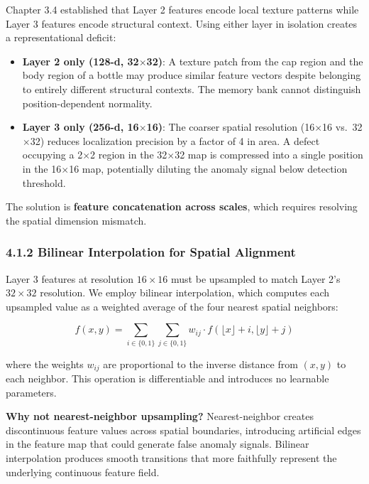 \documentclass[12pt, a4paper, oneside]{report}
\begin{document}
Chapter 3.4 established that Layer 2 features encode local texture patterns while Layer 3 features encode structural context. Using either layer in isolation creates a representational deficit:

\begin{itemize}
\item
  \textbf{Layer 2 only (128-d, 32$\times$32)}: A texture patch from the cap region and the body region of a bottle may produce similar feature vectors despite belonging to entirely different structural contexts. The memory bank cannot distinguish position-dependent normality.
\item
  \textbf{Layer 3 only (256-d, 16$\times$16)}: The coarser spatial resolution (16$\times$16 vs.~32$\times$32) reduces localization precision by a factor of 4 in area. A defect occupying a 2$\times$2 region in the 32$\times$32 map is compressed into a single position in the 16$\times$16 map, potentially diluting the anomaly signal below detection threshold.
\end{itemize}

The solution is \textbf{feature concatenation across scales}, which requires resolving the spatial dimension mismatch.

\subsubsection{4.1.2 Bilinear Interpolation for Spatial Alignment}\label{bilinear-interpolation-for-spatial-alignment}

Layer 3 features at resolution \(16 \times 16\) must be upsampled to match Layer 2's \(32 \times 32\) resolution. We employ bilinear interpolation, which computes each upsampled value as a weighted average of the four nearest spatial neighbors:

\[f(x, y) = \sum_{i \in \{0,1\}} \sum_{j \in \{0,1\}} w_{ij} \cdot f(\lfloor x \rfloor + i, \lfloor y \rfloor + j)\]

where the weights \(w_{ij}\) are proportional to the inverse distance from \((x, y)\) to each neighbor. This operation is differentiable and introduces no learnable parameters.

\textbf{Why not nearest-neighbor upsampling?} Nearest-neighbor creates discontinuous feature values across spatial boundaries, introducing artificial edges in the feature map that could generate false anomaly signals. Bilinear interpolation produces smooth transitions that more faithfully represent the underlying continuous feature field.
\end{document}
